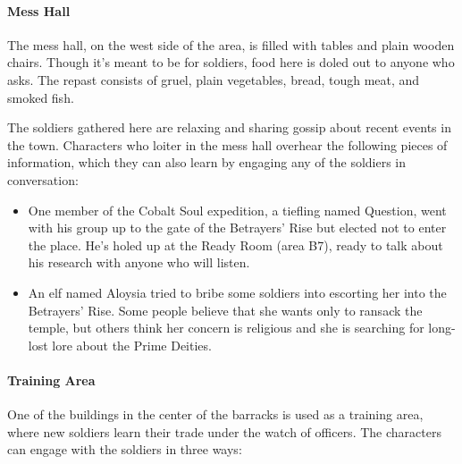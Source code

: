 \documentclass[a4paper, 11pt, bg=full, twocolumn, nooutline]{dndbook}
\begin{document}
\paragraph{Mess Hall}

The mess hall, on the west side of the area, is filled with tables and plain wooden chairs. Though it's meant to be for soldiers, food here is doled out to anyone who asks. The repast consists of gruel, plain vegetables, bread, tough meat, and smoked fish.

The soldiers gathered here are relaxing and sharing gossip about recent events in the town. Characters who loiter in the mess hall overhear the following pieces of information, which they can also learn by engaging any of the soldiers in conversation:

\begin{itemize}
\item One member of the Cobalt Soul expedition, a tiefling named Question, went with his group up to the gate of the Betrayers' Rise but elected not to enter the place. He's holed up at the Ready Room (area B7), ready to talk about his research with anyone who will listen.
\item An elf named Aloysia tried to bribe some soldiers into escorting her into the Betrayers' Rise. Some people believe that she wants only to ransack the temple, but others think her concern is religious and she is searching for long-lost lore about the Prime Deities.
\end{itemize}

\paragraph{Training Area}

One of the buildings in the center of the barracks is used as a training area, where new soldiers learn their trade under the watch of officers. The characters can engage with the soldiers in three ways:
\end{document}

